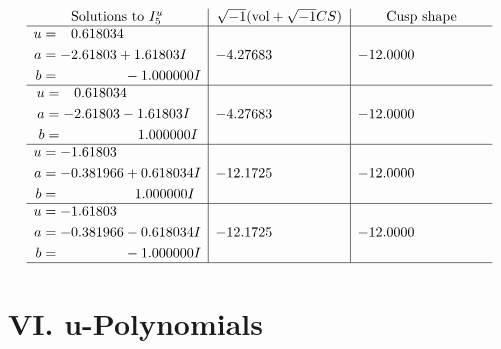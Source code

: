 \documentclass[1p]{elsarticle_modified}
\theoremstyle{definition}
\newcommand{\I}{\sqrt{-1}}
\begin{document}
$$\begin{array}{c|c|c}  
\text{Solutions to }I^u_{5}& \I (\text{vol} + \sqrt{-1}CS) & \text{Cusp shape}\\
 \hline 
\begin{aligned}
u &= \phantom{-}0.618034\phantom{ +0.000000I} \\
a &= -2.61803 + 1.61803 I \\
b &= \phantom{-0.000000 } -1.000000 I\end{aligned}
 & -4.27683\phantom{ +0.000000I} & -12.0000\phantom{ +0.000000I} \\ \hline\begin{aligned}
u &= \phantom{-}0.618034\phantom{ +0.000000I} \\
a &= -2.61803 - 1.61803 I \\
b &= \phantom{-0.000000 -}1.000000 I\end{aligned}
 & -4.27683\phantom{ +0.000000I} & -12.0000\phantom{ +0.000000I} \\ \hline\begin{aligned}
u &= -1.61803\phantom{ +0.000000I} \\
a &= -0.381966 + 0.618034 I \\
b &= \phantom{-0.000000 -}1.000000 I\end{aligned}
 & -12.1725\phantom{ +0.000000I} & -12.0000\phantom{ +0.000000I} \\ \hline\begin{aligned}
u &= -1.61803\phantom{ +0.000000I} \\
a &= -0.381966 - 0.618034 I \\
b &= \phantom{-0.000000 } -1.000000 I\end{aligned}
 & -12.1725\phantom{ +0.000000I} & -12.0000\phantom{ +0.000000I}\\
 \hline 
 \end{array}$$\newpage
\newpage\renewcommand{\arraystretch}{1}
\centering \section*{ VI. u-Polynomials}
\end{document}

